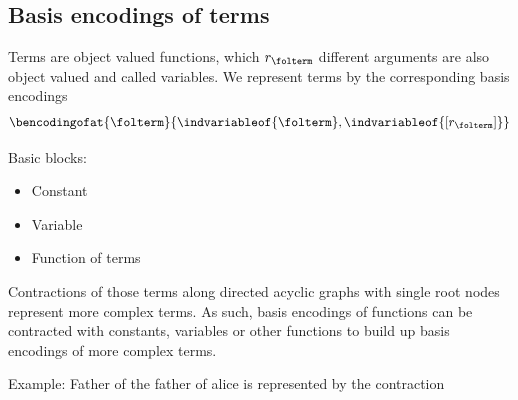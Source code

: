 \subsection{Basis encodings of terms}

Terms are object valued functions, which $r_{\folterm}$ different arguments are also object valued and called variables.
We represent terms by the corresponding basis encodings
\begin{align*}
    \bencodingofat{\folterm}{
        \indvariableof{\folterm}, \indvariableof{[r_{\folterm}]}
    }
\end{align*}

Basic blocks:
\begin{itemize}
    \item Constant
    \item Variable
    \item Function of terms
\end{itemize}
Contractions of those terms along directed acyclic graphs with single root nodes represent more complex terms.
As such, basis encodings of functions can be contracted with constants, variables or other functions to build up basis encodings of more complex terms.

Example: Father of the father of alice is represented by the contraction


